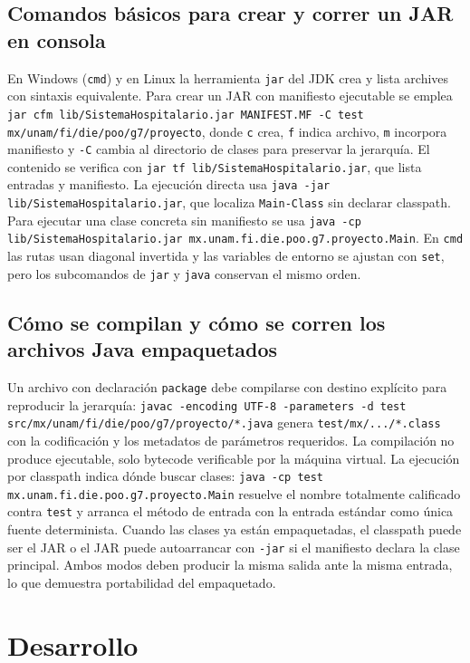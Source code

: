 \documentclass[letterpaper,12pt,oneside]{article}
\numberwithin{figure}{section}
\begin{document}
\subsection{Comandos b\'asicos para crear y correr un JAR en consola}
En Windows (\texttt{cmd}) y en Linux la herramienta \texttt{jar} del JDK crea y lista archives con sintaxis equivalente. Para crear un JAR con manifiesto ejecutable se emplea \texttt{jar cfm lib/SistemaHospitalario.jar MANIFEST.MF -C test mx/unam/fi/die/poo/g7/proyecto}, donde \texttt{c} crea, \texttt{f} indica archivo, \texttt{m} incorpora manifiesto y \texttt{-C} cambia al directorio de clases para preservar la jerarqu\'ia. El contenido se verifica con \texttt{jar tf lib/SistemaHospitalario.jar}, que lista entradas y manifiesto. La ejecuci\'on directa usa \texttt{java -jar lib/SistemaHospitalario.jar}, que localiza \texttt{Main-Class} sin declarar classpath. Para ejecutar una clase concreta sin manifiesto se usa \texttt{java -cp lib/SistemaHospitalario.jar mx.unam.fi.die.poo.g7.proyecto.Main}. En \texttt{cmd} las rutas usan diagonal invertida y las variables de entorno se ajustan con \texttt{set}, pero los subcomandos de \texttt{jar} y \texttt{java} conservan el mismo orden.

\subsection{C\'omo se compilan y c\'omo se corren los archivos Java empaquetados}
Un archivo con declaraci\'on \texttt{package} debe compilarse con destino expl\'icito para reproducir la jerarqu\'ia: \texttt{javac -encoding UTF-8 -parameters -d test src/mx/unam/fi/die/poo/g7/proyecto/*.java} genera \texttt{test/mx/.../*.class} con la codificaci\'on y los metadatos de par\'ametros requeridos. La compilaci\'on no produce ejecutable, solo bytecode verificable por la m\'aquina virtual. La ejecuci\'on por classpath indica d\'onde buscar clases: \texttt{java -cp test mx.unam.fi.die.poo.g7.proyecto.Main} resuelve el nombre totalmente calificado contra \texttt{test} y arranca el m\'etodo de entrada con la entrada est\'andar como \'unica fuente determinista. Cuando las clases ya est\'an empaquetadas, el classpath puede ser el JAR o el JAR puede autoarrancar con \texttt{-jar} si el manifiesto declara la clase principal. Ambos modos deben producir la misma salida ante la misma entrada, lo que demuestra portabilidad del empaquetado.

\section{Desarrollo}
\end{document}
